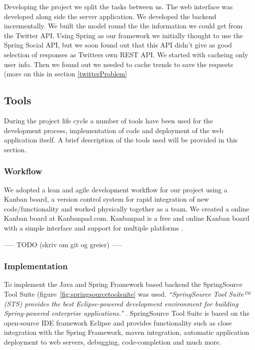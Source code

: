 Developing the project we split the tasks between us. The web interface was developed along side the server application. 
We developed the backend incrementally. We built the model round the the information we could get from the Twitter API. Using Spring as our framework we initially thought to use the Spring Social API, but we soon found out that this API didn't give as good selection of responses as Twitters own REST API.
 We started with cacheing only user info. Then we found out we needed to cache trends to save the requests (more on this in section \ref{twitterProblem}


\subsection{Tools}
During the project life cycle a number of tools have been used for the development process, implementation of code and deployment of the web application itself. A brief description of the tools used will be provided in this section.

\subsubsection{Workflow}

We adopted a lean and agile development workflow for our project using a Kanban board, a version control system for rapid integration of new code/functionality and worked physically together as a team. We created a online Kanban board at Kanbanpad.com. Kanbanpad is a free and online Kanban board with a simple interface and support for multiple platforms \cite{TheHybridGroup2012}.

----- TODO (skriv om git og greier) -----


\subsubsection{Implementation}
To implement the Java and Spring Framework based backend the SpringSource Tool Suite (figure~\ref{fig:springsourcetoolsuite} was used. \textit{``SpringSource Tool Suite™ (STS) provides the best Eclipse-powered development environment for building Spring-powered enterprise applications.''} \cite{SpringSource}. SpringSource Tool Suite is based on the open-source IDE framework Eclipse and provides functionality such as close integration with the Spring Framework, maven integration, automatic application deployment to web servers, debugging, code-completion and much more.

